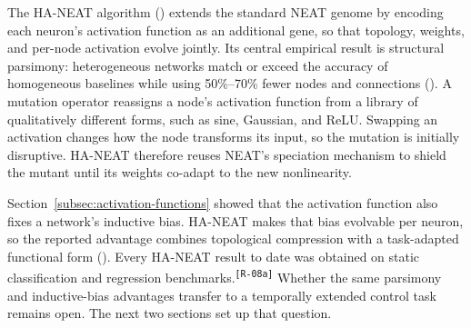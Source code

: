 \documentclass[12pt]{article}
\newcommand{\revID}[1]{\textsuperscript{\scriptsize\texttt{[#1]}}}
\newcommand{\revRepeat}[2]{\textcolor{revTeal}{#2}\revID{#1}}
\begin{document}




The HA-NEAT algorithm (\cite{hagg_evolving_2017}) extends the standard NEAT genome by encoding each neuron's activation function as an additional gene, so that topology, weights, and per-node activation evolve jointly.
Its central empirical result is structural parsimony: heterogeneous networks match or exceed the accuracy of homogeneous baselines while using 50\%--70\% fewer nodes and connections (\cite{hagg_evolving_2017}).
A mutation operator reassigns a node's activation function from a library of qualitatively different forms, such as sine, Gaussian, and ReLU.
Swapping an activation changes how the node transforms its input, so the mutation is initially disruptive.
HA-NEAT therefore reuses NEAT's speciation mechanism to shield the mutant until its weights co-adapt to the new nonlinearity.

Section~\ref{subsec:activation-functions} showed that the activation function also fixes a network's inductive bias.
HA-NEAT makes that bias evolvable per neuron, so the reported advantage combines topological compression with a task-adapted functional form (\cite{papavasileiou_optimizing_2022}).
\revRepeat{R-08a}{Every HA-NEAT result to date was obtained on static classification and regression benchmarks.}
Whether the same parsimony and inductive-bias advantages transfer to a temporally extended control task remains open. The next two sections set up that question.
\end{document}
